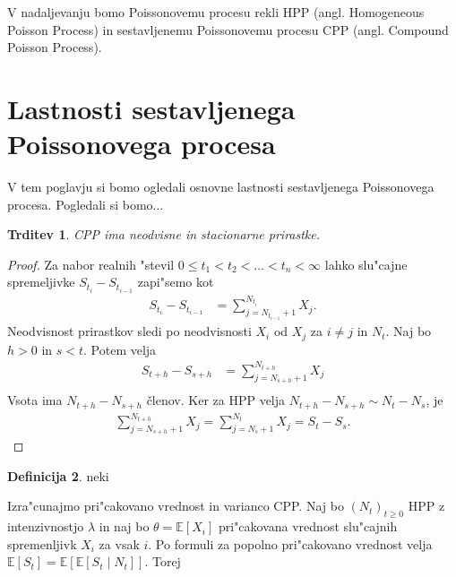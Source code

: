 \documentclass[12pt,a4paper]{amsart}
\theoremstyle{definition} %
\newtheorem{definicija}{Definicija}[section]
\theoremstyle{plain} %
\newtheorem{trditev}[definicija]{Trditev}
\newcommand{\E}{\mathbb{E}}
\newcommand{\1}{\mathds{1}}
\begin{document}
    V nadaljevanju bomo Poissonovemu procesu rekli HPP (angl. Homogeneous Poisson Process) in 
    sestavljenemu Poissonovemu procesu CPP (angl. Compound Poisson Process).

\section{Lastnosti sestavljenega Poissonovega procesa}

    V tem poglavju si bomo ogledali osnovne lastnosti sestavljenega Poissonovega procesa. Pogledali
    si bomo... 
    \begin{trditev}
        CPP ima neodvisne in stacionarne prirastke.
        \label{trd:neodvPrirCPP}
    \end{trditev}

    \begin{proof}
        Za nabor realnih "stevil $0 \leq t_1 < t_2 < \ldots < t_n < \infty$ lahko slu"cajne
        spremeljivke $S_{t_i} - S_{t_{i-1}}$ zapi"semo kot
        \begin{align*}
            S_{t_i} - S_{t_{i-1}} &= \sum_{j=N_{t_{i-1}}+1}^{N_{t_i}} X_j. 
        \end{align*}
        Neodvisnost prirastkov sledi po neodvisnosti $X_i$ od $X_j$ za $i\neq j$ in $N_t$. 
        Naj bo $h > 0$ in $s < t$. Potem velja
        \begin{align*}
            S_{t+h} - S_{s+h} &= \sum_{j=N_{s+h}+1}^{N_{t+h}} X_j \\
        \end{align*}
        Vsota ima $N_{t+h} - N_{s+h}$ členov. Ker za HPP velja 
        $N_{t+h} - N_{s+h} \sim N_t - N_s$, je 
        \begin{align*}
            \sum_{j=N_{s+h}+1}^{N_{t+h}} X_j = \sum_{j=N_{s}+1}^{N_{t}} X_j = S_t - S_s.
        \end{align*}
    \end{proof}

    \begin{definicija}
        neki
    \end{definicija}

    Izra"cunajmo pri"cakovano vrednost in varianco CPP. Naj bo $(N_t)_{t\geq 0}$ HPP z 
    intenzivnostjo $\lambda$ in naj bo $\theta = \E\left[X_i\right]$ pri"cakovana vrednost 
    slu"cajnih spremenljivk $X_i$ za vsak $i$. Po formuli za popolno pri"cakovano vrednost velja 
    $\E\left[S_t\right] = \E\left[\E\left[S_t\mid N_t\right]\right]$. Torej
\end{document}
